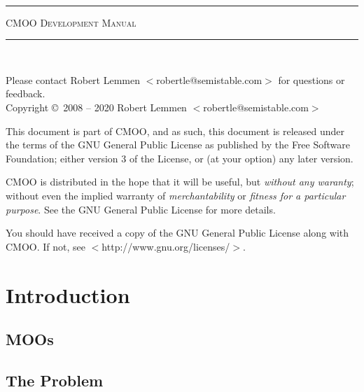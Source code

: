\documentclass[12pt,a4paper]{article}
\let\oldsection\section
\renewcommand\section{\clearpage\oldsection}
\begin{document}
\thispagestyle{empty}
~\vspace{141pt}
\begin{center}
\rule{\textwidth}{1pt}\vspace{20pt}
{\Huge\scshape CMOO Development Manual}\vspace{8pt}
\rule{\textwidth}{1pt}
\end{center}
\clearpage

\thispagestyle{empty}
\ifdefined\gitversion\gitversion\fi~

Please contact Robert Lemmen $<$robertle@semistable.com$>$ for questions or
feedback.
\\
Copyright \copyright~2008 -- 2020 Robert Lemmen $<$robertle@semistable.com$>$

This document is part of CMOO, and as such, this document is released under the terms of the GNU General Public License as published by the Free Software Foundation; either version 3 of the License, or (at your option) any later version.

CMOO is distributed in the hope that it will be useful, but {\em without any
waranty}; without even the implied warranty of {\em merchantability} or {\em
fitness for a particular purpose}.  See the GNU General Public License for more details.

You should have received a copy of the GNU General Public License along with CMOO. If not, see $<$http://www.gnu.org/licenses/$>$.
\cleardoublepage

\tableofcontents
\cleardoublepage

\section{Introduction}\label{sec:introduction}


\subsection{MOOs}


\subsection{The Problem}

\end{document}
